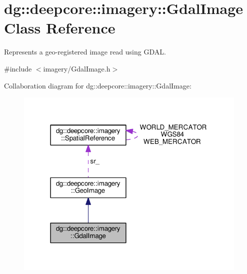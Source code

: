 \hypertarget{classdg_1_1deepcore_1_1imagery_1_1_gdal_image}{}\section{dg\+:\+:deepcore\+:\+:imagery\+:\+:Gdal\+Image Class Reference}
\label{classdg_1_1deepcore_1_1imagery_1_1_gdal_image}


Represents a geo-\/registered image read using G\+D\+AL.  




{\ttfamily \#include $<$imagery/\+Gdal\+Image.\+h$>$}



Collaboration diagram for dg\+:\+:deepcore\+:\+:imagery\+:\+:Gdal\+Image\+:
\nopagebreak
\begin{figure}[H]
\begin{center}
\leavevmode
\includegraphics[width=315pt]{classdg_1_1deepcore_1_1imagery_1_1_gdal_image__coll__graph}
\end{center}
\end{figure}
